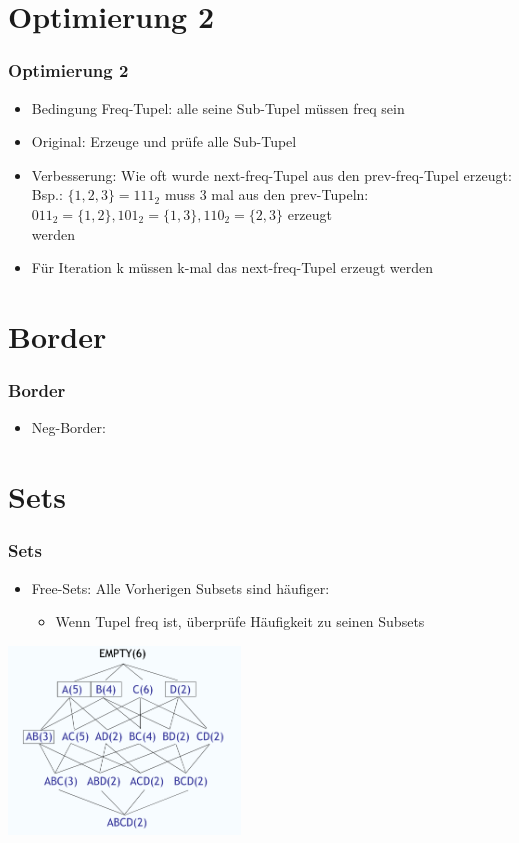 \documentclass{beamer}
\begin{document}
\section{Optimierung 2}
\begin{frame} %
	\frametitle{Optimierung 2} %
		\begin{itemize}
			\item Bedingung Freq-Tupel: alle seine Sub-Tupel müssen freq sein
			\item Original: Erzeuge und prüfe alle Sub-Tupel 
			\item Verbesserung: Wie oft wurde next-freq-Tupel aus den prev-freq-Tupel erzeugt:\\
				\hspace{0.7cm}Bsp.: $\{1,2,3\} = 111_2$ muss 3 mal aus den prev-Tupeln: \\
				\hspace{1.0cm}${011_2=\{1,2\}, 101_2=\{1,3\}, 110_2=\{2,3\}}$ erzeugt\\
				\hspace{1.0cm}werden
				\hspace{0.7cm} 
			\item Für Iteration k müssen k-mal das next-freq-Tupel erzeugt werden
		\end{itemize}
\end{frame}


\section{Border}
\begin{frame} %
	\frametitle{Border} %
		\begin{itemize}
			\item Neg-Border:
		\end{itemize}
\end{frame}

\section{Sets}
\begin{frame} %
	\frametitle{Sets} %
		\begin{itemize}
			\item Free-Sets: Alle Vorherigen Subsets sind häufiger:
				\begin{itemize}
					\item Wenn Tupel freq ist, überprüfe Häufigkeit zu seinen Subsets
				\end{itemize}
		\end{itemize}
		\centering
		\includegraphics[height=5cm]{pictures/free_sets.png}
\end{frame}
\end{document}
